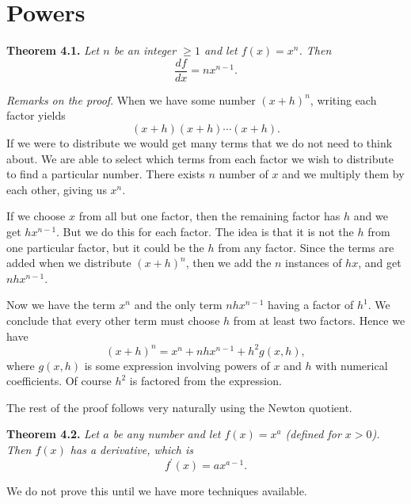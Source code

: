 \section*{Powers}

\indent\textbf{Theorem 4.1.} \textit{Let $n$ be an integer $\ge 1$ and let $f(x) = x^n$. Then
  \[\frac{df}{dx} = nx^{n-1}.\]}

\indent\textit{Remarks on the proof}. When we have some number $(x + h)^n$, writing each factor yields
\[(x + h)(x + h)\cdots (x + h).\]
If we were to distribute we would get many terms that we do not need to think about. We are able to select which
terms from each factor we wish to distribute to find a particular number. There exists $n$ number of $x$ and we
multiply them by each other, giving us $x^n$.

If we choose $x$ from all but one factor, then the remaining factor has $h$ and we get $hx^{n-1}$.
But we do this for each factor. The idea is that it is not the $h$ from one particular factor,
but it could be the $h$ from any factor.
Since the terms are added when we distribute $(x + h)^n$, then we add the $n$ instances of $hx$, and
get $nhx^{n-1}$.

Now we have the term $x^n$ and the only term $nhx^{n-1}$ having a factor of $h^1$. We conclude that every other
term must choose $h$ from at least two factors. Hence we have
\[(x + h)^n = x^n + nhx^{n-1} + h^2g(x, h),\]
where $g(x,h)$ is some expression involving powers of $x$ and $h$ with numerical coefficients. Of course $h^2$
is factored from the expression.

The rest of the proof follows very naturally using the Newton quotient.

\textbf{Theorem 4.2.} \textit{Let $a$ be any number and let $f(x) = x^a$ (defined for $x > 0$). Then $f(x)$ has
  a derivative, which is}
  \[f^\prime(x) = ax^{a-1}.\]

  We do not prove this until we have more techniques available.
